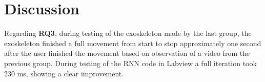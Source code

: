 \section{Discussion}
\label{section:disc}

Regarding \textbf{RQ3}, during testing of the exoskeleton made by the last group, the exoskeleton finished a full movement from start to stop approximately 
one second after the user finished the movement based on observation of a video from the previous group. During testing of the RNN 
code in Labview a full iteration took 230 ms, showing a clear improvement.